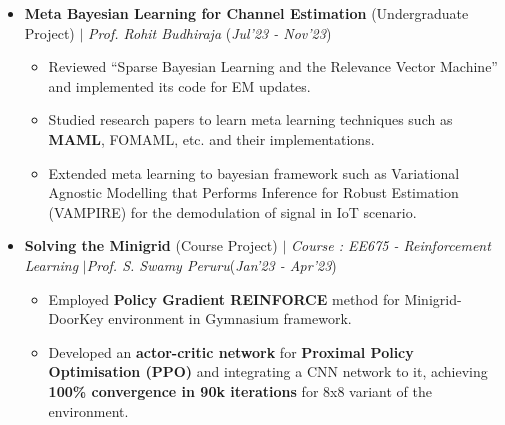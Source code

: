 \documentclass[10pt]{extarticle}
\begin{document}
\begin{itemize} 

\item \textbf{Meta Bayesian Learning for Channel Estimation} (Undergraduate Project) $|$ \textit{\small{Prof. Rohit Budhiraja}} \hfill\hfill(\textit{Jul'23 -  Nov'23})\\
\begin{itemize}[leftmargin=2mm]

\item Reviewed “Sparse Bayesian Learning and the Relevance Vector Machine” and implemented its code for EM updates.
\item Studied research papers to learn meta learning techniques such as \textbf{MAML}, FOMAML, etc. and their implementations.
\item Extended meta learning to bayesian framework such as Variational Agnostic Modelling that Performs Inference for Robust Estimation (VAMPIRE) for the demodulation of signal in IoT scenario.
\end{itemize}

\item \textbf{Solving the Minigrid} (Course Project) $|$ \textit{\small{Course : EE675 - Reinforcement Learning}} $|$\textit{\small{Prof. S. Swamy Peruru}}\hfill\hfill(\textit{Jan'23 -  Apr'23})\\
\begin{itemize}[leftmargin=2mm]
\item Employed \textbf{Policy Gradient REINFORCE} method for Minigrid-DoorKey environment in Gymnasium framework.
\item Developed an \textbf{actor-critic network} for \textbf{Proximal Policy Optimisation (PPO)} and integrating a CNN network to it, achieving \textbf{100\% convergence in 90k iterations} for 8x8 variant of the environment.

\end{itemize}


\end{itemize}
\end{document}
